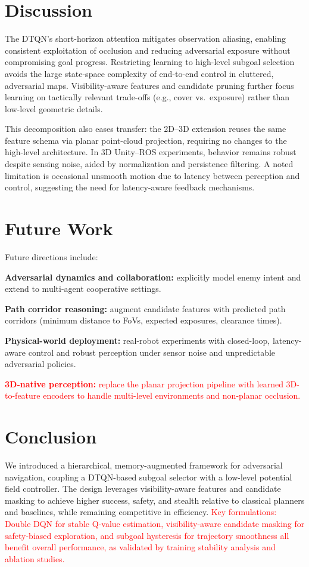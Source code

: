 \documentclass[letterpaper, 10 pt, conference]{ieeeconf}
\begin{document}
\section{Discussion}
The DTQN’s short-horizon attention mitigates observation aliasing, enabling consistent exploitation of occlusion and reducing adversarial exposure without compromising goal progress. Restricting learning to high-level subgoal selection avoids the large state-space complexity of end-to-end control in cluttered, adversarial maps. Visibility-aware features and candidate pruning further focus learning on tactically relevant trade-offs (e.g., cover vs.\ exposure) rather than low-level geometric details.  

This decomposition also eases transfer: the 2D–3D extension reuses the same feature schema via planar point-cloud projection, requiring no changes to the high-level architecture. In 3D Unity--ROS experiments, behavior remains robust despite sensing noise, aided by normalization and persistence filtering. A noted limitation is occasional unsmooth motion due to latency between perception and control, suggesting the need for latency-aware feedback mechanisms.  

\section{Future Work}
Future directions include:
\begin{itemize}
    \item \textbf{Adversarial dynamics and collaboration:} explicitly model enemy intent and extend to multi-agent cooperative settings.
    \item \textbf{Path corridor reasoning:} augment candidate features with predicted path corridors (minimum distance to FoVs, expected exposures, clearance times).
    \item \textbf{Physical-world deployment:} real-robot experiments with closed-loop, latency-aware control and robust perception under sensor noise and unpredictable adversarial policies.
    \textcolor{red}{\item \textbf{3D-native perception:} replace the planar projection pipeline with learned 3D-to-feature encoders to handle multi-level environments and non-planar occlusion.}
\end{itemize}

\section{Conclusion}
We introduced a hierarchical, memory-augmented framework for adversarial navigation, coupling a DTQN-based subgoal selector with a low-level potential field controller. The design leverages visibility-aware features and candidate masking to achieve higher success, safety, and stealth relative to classical planners and baselines, while remaining competitive in efficiency. \textcolor{red}{Key formulations: Double DQN for stable Q-value estimation, visibility-aware candidate masking for safety-biased exploration, and subgoal hysteresis for trajectory smoothness all benefit overall performance, as validated by training stability analysis and ablation studies.}
\end{document}
